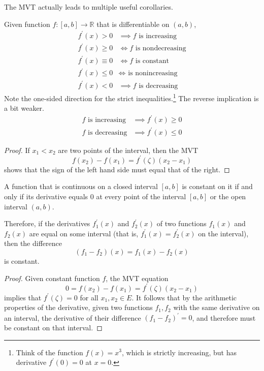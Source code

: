   The MVT actually leads to multiple useful corollaries. 

  \begin{theorem}
    Given function $f: [a, b] \longrightarrow \mathbb{R}$ that is differentiable on $(a, b)$, 
    \begin{align*}
      f^\prime (x) > 0 & \implies f \text{ is increasing} \\
      f^\prime (x) \geq 0 & \iff f \text{ is nondecreasing} \\
      f^\prime (x) \equiv 0 & \iff f \text{ is constant} \\
      f^\prime (x) \leq 0 & \iff \text{ is nonincreasing} \\
      f^\prime (x) < 0 & \implies f \text{ is decreasing} 
    \end{align*}
    Note the one-sided direction for the strict inequalities.\footnote{Think of the function $f(x) = x^3$, which is strictly increasing, but has derivative $f^\prime (0) = 0$ at $x = 0$.} The reverse implication is a bit weaker. 
    \begin{align*}
      f \text{ is increasing} & \implies f^\prime (x) \geq 0 \\
      f \text{ is decreasing} & \implies f^\prime (x) \leq 0
    \end{align*}
  \end{theorem}
  \begin{proof}
    If $x_1 < x_2$ are two points of the interval, then the MVT
    \begin{equation}
      f(x_2) - f(x_1) = f^\prime (\zeta) (x_2 - x_1)
    \end{equation}
    shows that the sign of the left hand side must equal that of the right. 
  \end{proof}

  \begin{corollary}
    A function that is continuous on a closed interval $[a,b]$ is constant on it if and only if its derivative equals $0$ at every point of the interval $[a,b]$ or the open interval $(a, b)$. 

    Therefore, if the derivatives $f_1^\prime (x)$ and $f_2^\prime (x)$ of two functions $f_1 (x)$ and $f_2 (x)$ are equal on some interval (that is, $f_1^\prime (x) = f_2^\prime (x)$ on the interval), then the difference
    \begin{equation}
      (f_1 - f_2) (x) = f_1 (x) - f_2 (x)
    \end{equation}
    is constant. 
  \end{corollary}
  \begin{proof}
    Given constant function $f$, the MVT equation 
    \begin{equation}
      0 = f(x_2) - f(x_1) = f^\prime (\zeta) (x_2 - x_1)
    \end{equation}
    implies that $f^\prime (\zeta) = 0$ for all $x_1, x_2 \in E$. It follows that by the arithmetic properties of the derivative, given two functions $f_1, f_2$ with the same derivative on an interval, the derivative of their difference $(f_1 - f_2)^\prime = 0$, and therefore must be constant on that interval. 
  \end{proof}

